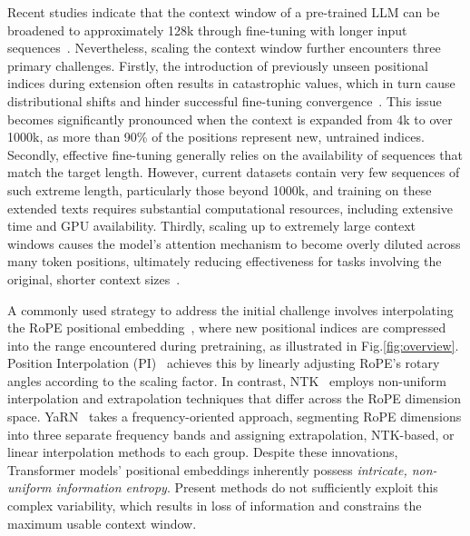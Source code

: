 Recent studies indicate that the context window of a pre-trained LLM can be broadened to approximately 128k through fine-tuning with longer input sequences~\cite{longlora,pi,yarn,zhang2024soaring,liu2023scaling}. Nevertheless, scaling the context window further encounters three primary challenges. Firstly, the introduction of previously unseen positional indices during extension often results in catastrophic values, which in turn cause distributional shifts and hinder successful fine-tuning convergence~\cite{pi}. This issue becomes significantly pronounced when the context is expanded from 4k to over 1000k, as more than 90\% of the positions represent new, untrained indices. Secondly, effective fine-tuning generally relies on the availability of sequences that match the target length. However, current datasets contain very few sequences of such extreme length, particularly those beyond 1000k, and training on these extended texts requires substantial computational resources, including extensive time and GPU availability. Thirdly, scaling up to extremely large context windows causes the model’s attention mechanism to become overly diluted across many token positions, ultimately reducing effectiveness for tasks involving the original, shorter context sizes~\cite{pi}.

A commonly used strategy to address the initial challenge involves interpolating the RoPE positional embedding~\cite{rope,pi}, where new positional indices are compressed into the range encountered during pretraining, as illustrated in Fig.\ref{fig:overview}. Position Interpolation (PI)~\cite{pi} achieves this by linearly adjusting RoPE's rotary angles according to the scaling factor. In contrast, NTK~\cite{ntk,dynamicntk} employs non-uniform interpolation and extrapolation techniques that differ across the RoPE dimension space. YaRN~\cite{yarn} takes a frequency-oriented approach, segmenting RoPE dimensions into three separate frequency bands and assigning extrapolation, NTK-based, or linear interpolation methods to each group. Despite these innovations, Transformer models' positional embeddings inherently possess \emph{intricate, non-uniform information entropy}. Present methods do not sufficiently exploit this complex variability, which results in loss of information and constrains the maximum usable context window.


